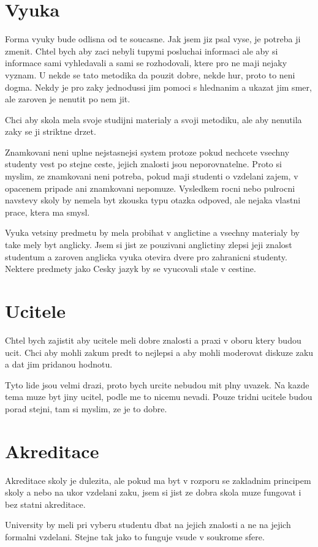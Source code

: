 \documentclass[12pt,a4paper]{article}
\begin{document}
\section*{Vyuka}

Forma vyuky bude odlisna od te soucasne. Jak jsem jiz psal vyse, je potreba ji zmenit. Chtel bych aby zaci nebyli tupymi posluchai informaci ale aby si informace sami vyhledavali a sami se rozhodovali, ktere pro ne maji nejaky vyznam. U nekde se tato metodika da pouzit dobre, nekde hur, proto to neni dogma. Nekdy je pro zaky jednodussi jim pomoci s hlednanim a ukazat jim smer, ale zaroven je nenutit po nem jit.

Chci aby skola mela svoje studijni materialy a svoji metodiku, ale aby nenutila zaky se ji striktne drzet.

Znamkovani neni uplne nejstasnejsi system protoze pokud nechcete vsechny studenty vest po stejne ceste, jejich znalosti jsou neporovnatelne. Proto si myslim, ze znamkovani neni potreba, pokud maji studenti o vzdelani zajem, v opacenem pripade ani znamkovani nepomuze. Vysledkem rocni nebo pulrocni navstevy skoly by nemela byt zkouska typu otazka odpoved, ale nejaka vlastni prace, ktera ma smysl.

Vyuka vetsiny predmetu by mela probihat v anglictine a vsechny materialy by take mely byt anglicky. Jsem si jist ze pouzivani anglictiny zlepsi jeji znalost studentum a zaroven anglicka vyuka otevira dvere pro zahranicni studenty. Nektere predmety jako Cesky jazyk by se vyucovali stale v cestine.

\section*{Ucitele}

Chtel bych zajistit aby ucitele meli dobre znalosti a praxi v oboru ktery budou ucit. Chci aby mohli zakum predt to nejlepsi a aby mohli moderovat diskuze zaku a dat jim pridanou hodnotu.

Tyto lide jsou velmi drazi, proto bych urcite nebudou mit plny uvazek. Na kazde tema muze byt jiny ucitel, podle me to nicemu nevadi. Pouze tridni ucitele budou porad stejni, tam si myslim, ze je to dobre.


\section*{Akreditace}

Akreditace skoly je dulezita, ale pokud ma byt v rozporu se zakladnim principem skoly a nebo na ukor vzdelani zaku, jsem si jist ze dobra skola muze fungovat i bez statni akreditace.

University by meli pri vyberu studentu dbat na jejich znalosti a ne na jejich formalni vzdelani. Stejne tak jako to funguje vsude v soukrome sfere.
\end{document}

